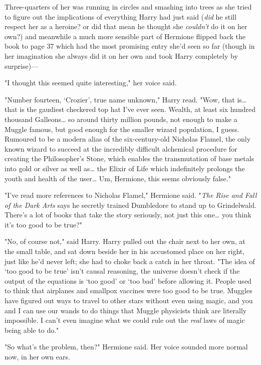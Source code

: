 Three-quarters of her was running in circles and smashing into trees as she
tried to figure out the implications of everything Harry had just said
(\emph{did} he still respect her as a heroine? or did that mean he thought she
\emph{couldn't} do it on her own?) and meanwhile a much more sensible part of
Hermione flipped back the book to page 37 which had the most promising entry
she'd seen so far (though in her imagination she always did it on her own and
took Harry completely by surprise)---

"I thought this seemed quite interesting," her voice said.

"Number fourteen, `Crozier', true name unknown," Harry read. "Wow, that
is{\ldots} that is the gaudiest checkered top hat I've ever seen. Wealth, at
least six hundred thousand Galleons{\ldots} so around thirty million pounds,
not enough to make a Muggle famous, but good enough for the smaller wizard
population, I guess. Rumoured to be a modern alias of the six-century-old
Nicholas Flamel, the only known wizard to succeed at the incredibly difficult
alchemical procedure for creating the Philosopher's Stone, which enables the
transmutation of base metals into gold or silver as well as{\ldots} the Elixir
of Life which indefinitely prolongs the youth and health of the user{\ldots}
Um, Hermione, this seems obviously false."

"I've read more references to Nicholas Flamel," Hermione said. "\emph{The Rise
and Fall of the Dark Arts} says he secretly trained Dumbledore to stand up to
Grindelwald. There's a lot of books that take the story seriously, not just
this one{\ldots} you think it's too good to be true?"

"No, of course not," said Harry. Harry pulled out the chair next to her own, at
the small table, and sat down beside her in his accustomed place on her right,
just like he'd never left; she had to choke back a catch in her throat. "The
idea of `too good to be true' isn't causal reasoning, the universe doesn't
check if the output of the equations is `too good' or `too bad' before allowing
it. People used to think that airplanes and smallpox vaccines were too good to
be true. Muggles have figured out ways to travel to other stars without even
using magic, and you and I can use our wands to do things that Muggle
physicists think are literally impossible. I can't even imagine what we could
rule out the \emph{real} laws of magic being able to do."

"So what's the problem, then?" Hermione said. Her voice sounded more normal
now, in her own ears.

